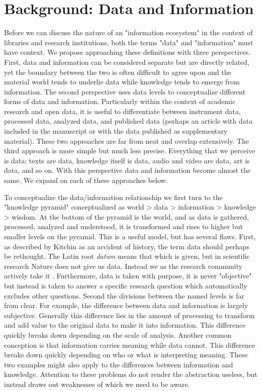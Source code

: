 \section{Background: Data and Information}

Before we can discuss the nature of an "information ecosystem" in the context of libraries and research institutions, both the terms "data" and "information" must have context. We propose approaching these definitions with three perspectives. First, data and information can be considered separate but are directly related, yet the boundary between the two is often difficult to agree upon and the material world tends to underlie data while knowledge tends to emerge from information. The second perspective uses data levels to conceptualize different forms of data and information. Particularly within the context of academic research and open data, it is useful to differentiate between instrument data, processed data, analyzed data, and published data (perhaps an article with data included in the manuscript or with the data published as supplementary material). These two approaches are far from neat and overlap extensively. The third approach is more simple but much less precise. Everything that we perceive is data: texts are data, knowledge itself is data, audio and video are data, art is data, and so on. With this perspective data and information become almost the same. We expand on each of these approaches below.

To conceptualize the data/information relationship we first turn to the "knowledge pyramid" conceptualized as world > data > information > knowledge > wisdom. At the bottom of the pyramid is the world, and as data is gathered, processed, analyzed and understood, it is transformed and rises to higher but smaller levels on the pyramid. This is a useful model, but has several flaws. First, as described by Kitchin as an accident of history, the term data should perhaps be rethought. The Latin root \textit{datum} means that which is given, but in scientific research Nature does not give us data. Instead we as the research community actively take it \citep{kitchin_2014}. Furthermore, data is taken with purpose, it is never "objective" but instead is taken to answer a specific research question which automatically excludes other questions. Second the divisions between the named levels is far from clear. For example, the difference between data and information is largely subjective. Generally this difference lies in the amount of processing to transform and add value to the original data to make it into information. This difference quickly breaks down depending on the scale of analysis. Another common conception is that information carries meaning while data cannot. This difference breaks down quickly depending on who or what is interpreting meaning. These two examples might also apply to the differences between information and knowledge. Attention to these problems do not render the abstraction useless, but instead draws out weaknesses of which we need to be aware.

